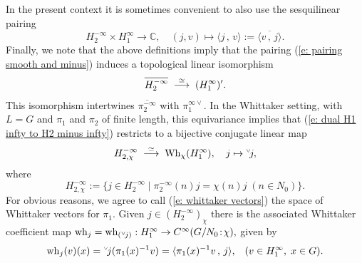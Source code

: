 \documentclass[12pt,a4paper]{article}
\def\msy#1{{\mathbb #1}}
\def\C{{\msy C}}
\def\to{\rightarrow}
\def\inp#1#2{\langle#1\,,\,#2\rangle}
\numberwithin{Thm}{section}
\numberwithin{equation}{section}
\def\Wh{{\rm Wh}}
\numberwithin{equation}{section}
\def\wh{{\rm wh}}
\def\col{\!:\!}
\def\cchi{\chi}
\def\veec{\vee}%
\def\trw{{}^{\scriptscriptstyle\veec}}
\begin{document}
In the present context it is sometimes  convenient to also use the sesquilinear pairing
\begin{equation} 
\label{e: reversed order pairing}
H_2^{-\infty} \times H_1^\infty \to \C, \quad  (j, v) \mapsto \inp{j}{v}:= \overline{\inp{v}{j}}.
\end{equation}
Finally, we note that the above definitions imply that the pairing (\ref{e: pairing smooth and minus})
induces a topological linear isomorphism 
\begin{equation}
\label{e: dual H1 infty to H2 minus infty}
\overline{H_2^{-\infty}}  \;\; {\buildrel \simeq \over \longrightarrow}\;\; (H_1^\infty)'.
\end{equation}
This isomorphism intertwines $\overline{\pi_2^{-\infty}}$ with $\pi_1^{\infty\veec}.$
In the Whittaker setting, with $L = G$ and $\pi_1$ and $\pi_2$ of finite length,
this equivariance implies that (\ref{e: dual H1 infty to H2 minus infty}) restricts
to a bijective conjugate linear 
map 
\begin{equation}
\label{e: from j to wj}
H_{2,\chi}^{-\infty} \;\; {\buildrel \simeq \over \longrightarrow}\;\;   \Wh_\chi(H_1^\infty),\quad
j \mapsto \trw\! j,
\end{equation}
where
\begin{equation}
\label{e: whittaker vectors}
 H_{2,\chi}^{-\infty}:= \{j \in H_{2}^{-\infty}\mid \pi_2^{-\infty}(n) j = \chi(n) j\;  (n \in N_0)\}.
\end{equation} 
For obvious reasons, we agree to call (\ref{e: whittaker vectors})
the space of Whittaker vectors for $\pi_1.$ 
Given $j \in (H_2^{-\infty})_\cchi$ there is the associated Whittaker coefficient map
$\wh_j = \wh_{(\trw\! j)}: H_1^\infty \to C^\infty(G/N_0\col \cchi),$ given by 
$$ 
\wh_{j}(v)(x) = \trw\!j( \pi_1(x)^{-1} v) = \inp{ \pi_1(x)^{-1} v}{ j}, \;\;\;  (v \in H_1^\infty , \; x \in G).
$$%
\end{document}
